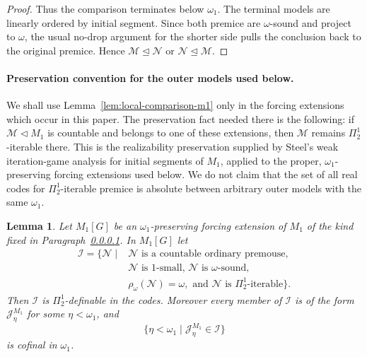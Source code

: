 \documentclass[a4paper,11pt]{article}
\newtheorem{lemma}[theorem]{Lemma}
\begin{document}
\begin{proof}
Thus the comparison terminates below $\omega_1$.  The terminal models are linearly ordered by initial segment.  Since both premice are $\omega$-sound and project to $\omega$, the usual no-drop argument for the shorter side pulls the conclusion back to the original premice.  Hence $\mathcal M\trianglelefteq\mathcal N$ or $\mathcal N\trianglelefteq\mathcal M$.
\end{proof}

\paragraph{Preservation convention for the outer models used below.}\label{par:steel-preservation-convention}
We shall use Lemma~\ref{lem:local-comparison-m1} only in the forcing extensions which occur in this paper.  The preservation fact needed there is the following: if $\mathcal M\triangleleft M_1$ is countable and belongs to one of these extensions, then $\mathcal M$ remains $\Pi^1_2$-iterable there.  This is the realizability preservation supplied by Steel's weak iteration-game analysis for initial segments of $M_1$, applied to the proper, $\omega_1$-preserving forcing extensions used below.  We do not claim that the set of all real codes for $\Pi^1_2$-iterable premice is absolute between arbitrary outer models with the same $\omega_1$.

\begin{lemma}
\label{lem:definable-m1-initial-segments}
Let $M_1[G]$ be an $\omega_1$-preserving forcing extension of $M_1$ of the kind fixed in Paragraph~\ref{par:steel-preservation-convention}.  In $M_1[G]$ let
\[
\begin{split}
   \mathcal I=\bigl\{\mathcal N\mid {}&
      \mathcal N\text{ is a countable ordinary premouse, }\\
      &\mathcal N\text{ is }1\text{-small, }\mathcal N\text{ is }\omega\text{-sound, }\\
      &\rho_\omega(\mathcal N)=\omega,
        \text{ and }\mathcal N\text{ is }\Pi^1_2\text{-iterable}\bigr\}.
\end{split}
\]
Then $\mathcal I$ is $\Pi^1_2$-definable in the codes.  Moreover every member of $\mathcal I$ is of the form $\mathcal J_\eta^{M_1}$ for some $\eta<\omega_1$, and
\[
   \{\eta<\omega_1\mid \mathcal J_\eta^{M_1}\in\mathcal I\}
\]
is cofinal in $\omega_1$.
\end{lemma}
\end{document}
